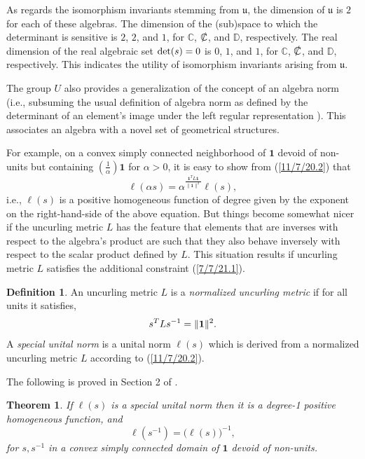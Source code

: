 \documentclass{amsart}
\numberwithin{equation}{section}
\newtheorem{theorem}{Theorem}
\theoremstyle{definition}
\newtheorem{definition}{Definition}[section]
\numberwithin{theorem}{section}
\begin{document}
  As regards the isomorphism invariants stemming from $\mathfrak{u}$, the dimension of $\mathfrak{u}$ is $2$ for each of these algebras.  The dimension of the (sub)space to which the determinant is sensitive is $2$, $2$, and $1$, for $\mathbb{C}$, $\slashed{\mathbb{C}}$, and $\mathbb{D}$, respectively.  The real dimension of the real algebraic set ${\rm det}(s) = 0$ is $0$, $1$, and $1$, for $\mathbb{C}$, $\slashed{\mathbb{C}}$, and $\mathbb{D}$, respectively.  This indicates the utility of isomorphism invariants arising from $\mathfrak{u}$. 

The group $U$ also provides a generalization of the concept of an algebra norm (i.e., subsuming the usual definition of algebra norm as defined by the determinant of an element's image under the left regular representation \cite{bourbaki:1989}).  This associates an algebra with a novel set of geometrical structures.


For example, on a convex simply connected neighborhood of $\mathbf{1}$ devoid of non-units but containing $\left(\frac{1}{\alpha}\right)\mathbf{1}$ for $\alpha>0$, it is easy to show from (\ref{11/7/20.2}) that \[  \ell(\alpha s) = \alpha^{\frac{\mathbf{1}^T L \mathbf{1}}{\|\mathbf{1}\|^2}} \ell(s),\] i.e., $ \ell(s)$ is a positive homogeneous function of degree given by the exponent on the right-hand-side of the above equation.  
 But things become somewhat nicer if the uncurling metric $L$ has the feature that elements that are inverses with respect to the algebra's product are such that they also behave inversely with respect to the scalar product defined by $L$.  This situation results if uncurling metric $L$ satisfies the additional constraint (\ref{7/7/21.1}).
 
\begin{definition} An uncurling metric $L$ is a {\it normalized uncurling metric} if for all units it satisfies, \begin{equation} \label{7/7/21.1} s^TLs^{-1} =\|{\bf 1}\|^2.\end{equation}  A {\it special unital norm} is a unital norm $ \ell(s)$ which is derived from a normalized uncurling metric $L$ according to (\ref{11/7/20.2}). 
\end{definition}

The following is proved in Section 2 of \cite{fgreensite:2023}.
\begin{theorem} If $ \ell(s)$ is a special unital norm then it is a degree-1 positive homogeneous function, and
\begin{equation}\label{5/23/23.3}  \ell(s^{-1}) = \big( \ell(s)\big)^{-1}, \end{equation} for $s,s^{-1}$ in a convex simply connected domain of $\mathbf{1}$ devoid of non-units. \end{theorem}
\end{document}
